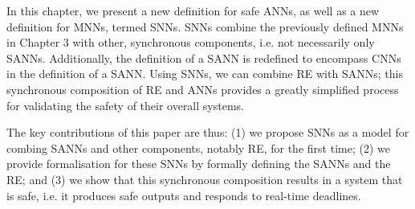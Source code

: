 
In this chapter, we present a new definition for safe \acp{ANN}, as well as a new definition for \acfp{MNN}, termed \acfp{SNN}.
\acp{SNN} combine the previously defined \acp{MNN} in Chapter 3 with other, synchronous components, i.e. not necessarily only \acp{SANN}.
Additionally, the definition of a \ac{SANN} is redefined to encompass \acfp{CNN} in the definition of a \ac{SANN}.
Using \acp{SNN}, we can combine \ac{RE} with \acp{SANN}; this synchronous composition of \ac{RE} and \acp{ANN} provides a greatly simplified process for validating the safety of their overall systems.

The key contributions of this paper are thus: (1) we propose \acp{SNN} as a model for combing \acp{SANN} and other components, notably \ac{RE}, for the first time; (2) we provide formalisation for these \acp{SNN} by formally defining the \acp{SANN} and the \ac{RE}; and (3) we show that this synchronous composition results in a system that is safe, i.e. it produces safe outputs and responds to real-time deadlines. 



